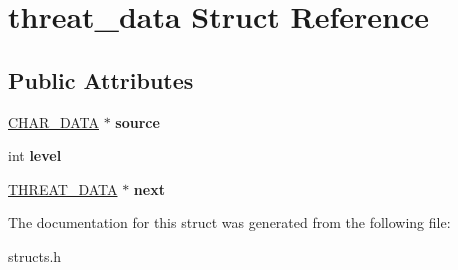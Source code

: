 \hypertarget{structthreat__data}{\section{threat\-\_\-data Struct Reference}
\label{structthreat__data}
}
\subsection*{Public Attributes}
\begin{DoxyCompactItemize}
\item 
\hypertarget{structthreat__data_ae95f97e186f4acfe7b4e589eeb67f621}{\hyperlink{structchar__data}{C\-H\-A\-R\-\_\-\-D\-A\-T\-A} $\ast$ {\bfseries source}}\label{structthreat__data_ae95f97e186f4acfe7b4e589eeb67f621}

\item 
\hypertarget{structthreat__data_a38446b0fbc783c5219581f8c90d6bf4f}{int {\bfseries level}}\label{structthreat__data_a38446b0fbc783c5219581f8c90d6bf4f}

\item 
\hypertarget{structthreat__data_a00ce1fcabee2023cd604cfe3084cbb59}{\hyperlink{structthreat__data}{T\-H\-R\-E\-A\-T\-\_\-\-D\-A\-T\-A} $\ast$ {\bfseries next}}\label{structthreat__data_a00ce1fcabee2023cd604cfe3084cbb59}

\end{DoxyCompactItemize}


The documentation for this struct was generated from the following file\-:\begin{DoxyCompactItemize}
\item 
structs.\-h\end{DoxyCompactItemize}
